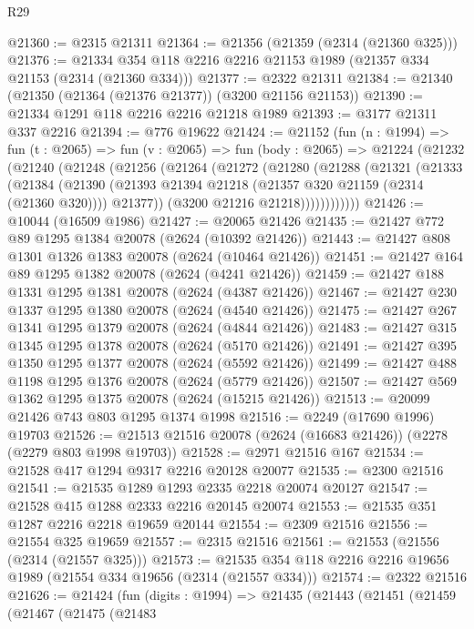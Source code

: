 \begin{lexlean}{R29}
\begin{coremodule}
@21360 := @2315 @21311
@21364 := @21356 (@21359 (@2314 (@21360 @325)))
@21376 := @21334 @354 @118 @2216 @2216 @21153 @1989 (@21357 @334 @21153 (@2314 (@21360 @334)))
@21377 := @2322 @21311
@21384 := @21340 (@21350 (@21364 (@21376 @21377)) (@3200 @21156 @21153))
@21390 := @21334 @1291 @118 @2216 @2216 @21218 @1989
@21393 := @3177 @21311 @337 @2216
@21394 := @776 @19622
@21424 := @21152
    (fun (n : @1994) =>
    fun (t : @2065) =>
    fun (v : @2065) =>
    fun (body : @2065) =>
    @21224
      (@21232
        (@21240
          (@21248
            (@21256
              (@21264
                (@21272
                  (@21280
                    (@21288
                      (@21321
                        (@21333
                          (@21384
                            (@21390
                              (@21393 @21394 @21218 (@21357 @320 @21159 (@2314 (@21360 @320))))
                              @21377))
                          (@3200 @21216 @21218))))))))))))
@21426 := @10044 (@16509 @1986)
@21427 := @20065 @21426
@21435 := @21427 @772 @89 @1295 @1384 @20078 (@2624 (@10392 @21426))
@21443 := @21427 @808 @1301 @1326 @1383 @20078 (@2624 (@10464 @21426))
@21451 := @21427 @164 @89 @1295 @1382 @20078 (@2624 (@4241 @21426))
@21459 := @21427 @188 @1331 @1295 @1381 @20078 (@2624 (@4387 @21426))
@21467 := @21427 @230 @1337 @1295 @1380 @20078 (@2624 (@4540 @21426))
@21475 := @21427 @267 @1341 @1295 @1379 @20078 (@2624 (@4844 @21426))
@21483 := @21427 @315 @1345 @1295 @1378 @20078 (@2624 (@5170 @21426))
@21491 := @21427 @395 @1350 @1295 @1377 @20078 (@2624 (@5592 @21426))
@21499 := @21427 @488 @1198 @1295 @1376 @20078 (@2624 (@5779 @21426))
@21507 := @21427 @569 @1362 @1295 @1375 @20078 (@2624 (@15215 @21426))
@21513 := @20099 @21426 @743 @803 @1295 @1374 @1998
@21516 := @2249 (@17690 @1996) @19703
@21526 := @21513 @21516 @20078 (@2624 (@16683 @21426)) (@2278 (@2279 @803 @1998 @19703))
@21528 := @2971 @21516 @167
@21534 := @21528 @417 @1294 @9317 @2216 @20128 @20077
@21535 := @2300 @21516
@21541 := @21535 @1289 @1293 @2335 @2218 @20074 @20127
@21547 := @21528 @415 @1288 @2333 @2216 @20145 @20074
@21553 := @21535 @351 @1287 @2216 @2218 @19659 @20144
@21554 := @2309 @21516
@21556 := @21554 @325 @19659
@21557 := @2315 @21516
@21561 := @21553 (@21556 (@2314 (@21557 @325)))
@21573 := @21535 @354 @118 @2216 @2216 @19656 @1989 (@21554 @334 @19656 (@2314 (@21557 @334)))
@21574 := @2322 @21516
@21626 := @21424
    (fun (digits : @1994) =>
    @21435
      (@21443
        (@21451
          (@21459
            (@21467
              (@21475
                (@21483

\end{coremodule}
\end{lexlean}

